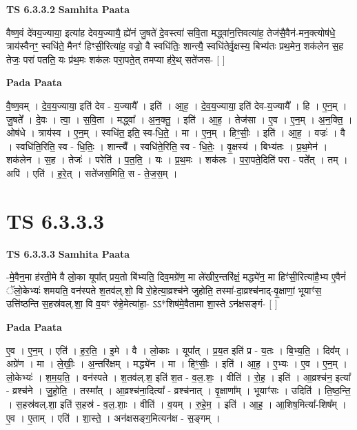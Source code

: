 \documentclass[17pt]{extarticle}
\begin{document}
\textbf{TS 6.3.3.2 } \newline
\textbf{Samhita Paata} \newline

वैष्ण॒वं दे॑वय॒ज्याया॒ इत्या॑ह देवय॒ज्यायै॒ ह्ये॑नं जु॒षते॑ दे॒वस्त्वा॑ सवि॒ता मद्ध्वा॑न॒त्तिवत्या॑ह॒ तेज॑सै॒वैन॑-मन॒क्त्योष॑धे॒ त्राय॑स्वैनꣳ॒॒ स्वधि॑ते॒ मैनꣳ॑ हिꣳसी॒रित्या॑ह॒ वज्रो॒ वै स्वधि॑तिः॒ शान्त्यै॒ स्वधि॑तेर्वृ॒क्षस्य॒ बिभ्य॑तः प्रथ॒मेन॒ शक॑लेन स॒ह तेजः॒ परा॑ पतति॒ यः प्र॑थ॒मः शक॑लः परा॒पते॒त् तमप्या ह॑रे॒थ् सते॑जस- [  ] \newline

\textbf{Pada Paata} \newline

वै॒ष्ण॒वम् । दे॒व॒य॒ज्याया॒ इति॑ देव - य॒ज्यायै᳚ । इति॑ । आ॒ह॒ । दे॒व॒य॒ज्याया॒ इति॑ देव-य॒ज्यायै᳚ । हि । ए॒न॒म् । जु॒षते᳚ । दे॒वः । त्वा॒ । स॒वि॒ता । मद्ध्वा᳚ । अ॒न॒क्तु॒ । इति॑ । आ॒ह॒ । तेज॑सा । ए॒व । ए॒न॒म् । अ॒न॒क्ति॒ । ओष॑धे । त्राय॑स्व । ए॒न॒म् । स्वधि॑त॒ इति॒ स्व-धि॒ते॒ । मा । ए॒न॒म् । हिꣳ॒॒सीः॒ । इति॑ । आ॒ह॒ । वज्रः॑ । वै । स्वधि॑ति॒रिति॒ स्व - धि॒तिः॒ । शान्त्यै᳚ । स्वधि॑ते॒रिति॒ स्व - धि॒तेः॒ । वृ॒क्षस्य॑ । बिभ्य॑तः । प्र॒थ॒मेन॑ । शक॑लेन । स॒ह । तेजः॑ । परेति॑ । प॒त॒ति॒ । यः । प्र॒थ॒मः । शक॑लः । प॒रा॒पते॒दिति॑ परा - पते᳚त् । तम् । अपि॑ । एति॑ । ह॒रे॒त् । सते॑जस॒मिति॒ स - ते॒ज॒स॒म् ।  \newline




\section*{ TS 6.3.3.3 }

\textbf{TS 6.3.3.3 } \newline
\textbf{Samhita Paata} \newline

-मे॒वैन॒मा ह॑रती॒मे वै लो॒का यूपा᳚त् प्रय॒तो बि॑भ्यति॒ दिव॒मग्रे॑ण॒ मा ले॑खीर॒न्तरि॑क्षं॒ मद्ध्ये॑न॒ मा हिꣳ॑सी॒रित्या॑है॒भ्य ए॒वैनं॑ ॅलो॒केभ्यः॑ शमयति॒ वन॑स्पते श॒तव॑ल्.शो॒ वि रो॒हेत्या॒व्रश्च॑ने जुहोति॒ तस्मा॑-दा॒व्रश्च॑नाद्-वृ॒क्षाणां॒ भूयाꣳ॑स॒ उत्ति॑ष्ठन्ति स॒हस्र॑वल्.शा॒ वि व॒यꣳ रु॑हे॒मेत्या॑हा॒- ऽऽ*शिष॑मे॒वैतामा शा॒स्ते ऽन॑क्षसङ्गं- [  ] \newline

\textbf{Pada Paata} \newline

ए॒व । ए॒न॒म् । एति॑ । ह॒र॒ति॒ । इ॒मे । वै । लो॒काः । यूपा᳚त् । प्र॒य॒त इति॑ प्र - य॒तः । बि॒भ्य॒ति॒ । दिव᳚म् । अग्रे॑ण । मा । ले॒खीः॒ । अ॒न्तरि॑क्षम् । मद्ध्ये॑न । मा । हिꣳ॒॒सीः॒ । इति॑ । आ॒ह॒ । ए॒भ्यः । ए॒व । ए॒न॒म् । लो॒केभ्यः॑ । श॒म॒य॒ति॒ । वन॑स्पते । श॒तव॑ल्.श॒ इति॑ श॒त - व॒ल॒.शः॒ । वीति॑ । रो॒ह॒ । इति॑ । आ॒व्रश्च॑न॒ इत्या᳚ - व्रश्च॑ने । जु॒हो॒ति॒ । तस्मा᳚त् । आ॒व्रश्च॑ना॒दित्या᳚ - व्रश्च॑नात् । वृ॒क्षाणा᳚म् । भूयाꣳ॑सः । उदिति॑ । ति॒ष्ठ॒न्ति॒ । स॒हस्र॑वल्.शा॒ इति॑ स॒हस्र॑ - व॒ल॒.शाः॒ । वीति॑ । व॒यम् । रु॒हे॒म॒ । इति॑ । आ॒ह॒ । आ॒शिष॒मित्या᳚-शिष᳚म् । ए॒व । ए॒ताम् । एति॑ । शा॒स्ते॒ । अन॑क्षसङ्ग॒मित्यन॑क्ष - स॒ङ्गम् ।  \newline
\end{document}
